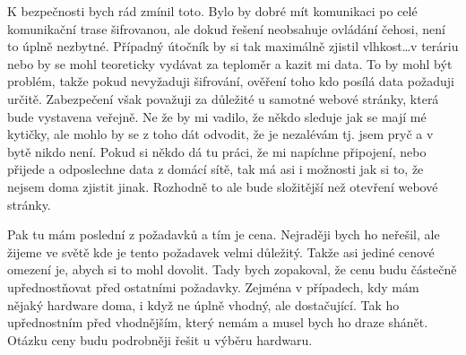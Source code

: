 K bezpečnosti bych rád zmínil toto. Bylo by dobré mít komunikaci po celé komunikační trase šifrovanou, ale dokud řešení 
neobsahuje ovládání čehosi, není to úplně nezbytné. Případný útočník by si tak maximálně zjistil vlhkost\ldots v teráriu
nebo by se mohl teoreticky vydávat za teploměr a kazit mi data. To by mohl být problém, takže pokud nevyžaduji 
šifrování, ověření toho kdo posílá data požaduji určitě. Zabezpečení však považuji za důležité u samotné webové stránky, 
která bude vystavena veřejně. Ne že by mi vadilo, že někdo sleduje jak se mají mé kytičky, ale mohlo by se z toho dát 
odvodit, že je nezalévám tj. jsem pryč a v bytě nikdo není. Pokud si někdo dá tu práci, že mi napíchne připojení, nebo 
přijede a odposlechne data z domácí sítě, tak má asi i možnosti jak si to, že nejsem doma zjistit jinak. Rozhodně to ale 
bude složitější než otevření webové stránky.

Pak tu mám poslední z požadavků a tím je cena. Nejraději bych ho neřešil, ale žijeme ve světě kde je tento požadavek 
velmi důležitý. Takže asi jediné cenové omezení je, abych si to mohl dovolit. Tady bych zopakoval, že cenu budu částečně 
upřednostňovat před ostatními požadavky. Zejména v případech, kdy mám nějaký hardware doma, i když ne úplně vhodný, ale 
dostačující. Tak ho upřednostním před vhodnějším, který nemám a musel bych ho draze shánět. Otázku ceny budu podrobněji 
řešit u výběru hardwaru.
